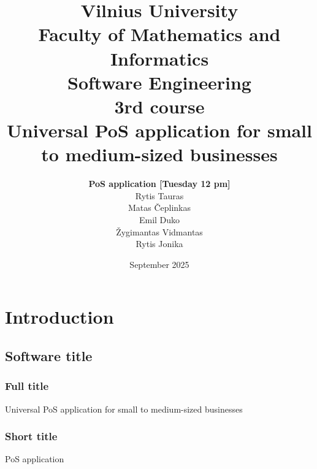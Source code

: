 \documentclass{article}
\title{Vilnius University\\Faculty of Mathematics and Informatics\\Software Engineering\\3rd course\\[1cm] \Huge Universal PoS application for small to medium-sized businesses\\[1cm]}
\author{\textbf{PoS application [Tuesday 12 pm]}\\[0.25cm]Rytis Tauras\\Matas Čeplinkas\\Emil Duko\\Žygimantas Vidmantas\\Rytis Jonika\\[4cm]}
\date{September 2025}
\begin{document}
\maketitle

\newpage
\setcounter{tocdepth}{3}
\tableofcontents
\newpage

\section{Introduction}
\subsection{Software title}
\subsubsection{Full title} Universal PoS application for small to medium-sized businesses
\subsubsection{Short title} PoS application
\end{document}
